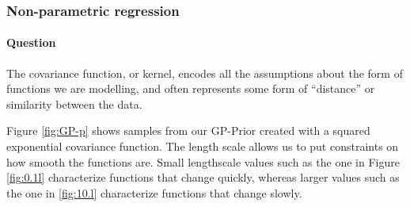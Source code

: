 \documentclass{article}
\newcounter{question}
\newcommand{\question}{\stepcounter{question}\paragraph{Question \thequestion}}
\begin{document}
\subsubsection{Non-parametric regression}
\question The covariance function, or kernel, encodes all the assumptions about the form of functions we are modelling, and often represents some form of “distance” or similarity between the data.

Figure \ref{fig:GP-p} shows samples from our GP-Prior created with a squared exponential covariance function. The length scale allows us to put constraints on how smooth the functions are. Small lengthscale values such as the one in Figure \ref{fig:0.1l} characterize functions that change quickly, whereas larger values such as the one in \ref{fig:10.l} characterize functions that change slowly.
\end{document}

